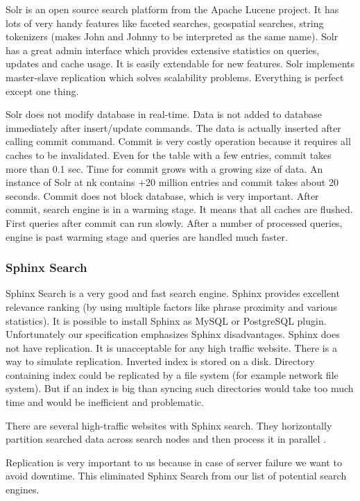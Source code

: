 \documentclass[10pt,a4paper]{article}
\begin{document}
Solr is an open source search platform from the Apache Lucene project. It has lots of very handy features like faceted searches, geospatial searches, string tokenizers (makes John and Johnny to be interpreted as the same name). Solr has a great admin interface which provides extensive statistics on queries, updates and cache usage. It is easily extendable for new features. Solr implements master-slave replication which solves scalability problems. Everything is perfect except one thing. 

Solr does not modify database in real-time. Data is not added to database immediately after insert/update commands. The data is actually inserted after calling commit command. Commit is very costly operation because it requires all caches to be invalidated. Even for the table with a few entries, commit takes more than 0.1 sec. Time for commit grows with a growing size of data. An instance of Solr at nk contains +20 million entries and commit takes about 20 seconds. Commit does not block database, which is very important. After commit, search engine is in a warming stage. It means that all caches are flushed. First queries after commit can run slowly. After a number of processed queries, engine is past warming stage and queries are handled much faster.

\subsubsection{Sphinx Search}

Sphinx Search is a very good and fast search engine. Sphinx provides excellent relevance ranking (by using multiple factors like phrase proximity and various statistics). It is possible to install Sphinx as MySQL or PostgreSQL plugin. Unfortunately our specification emphasizes Sphinx disadvantages.
Sphinx does not have replication. It is unacceptable for any high traffic website. There is a way to simulate replication. Inverted index is stored on a disk. Directory containing index could be replicated by a file system (for example network file system). But if an index is big than syncing such directories would take too much time and would be inefficient and problematic.

There are several high-traffic websites with Sphinx search. They horizontally partition searched data across search nodes and then process it in parallel \cite{SPHINXPARAL}.

Replication is very important to us because in case of server failure we want to avoid downtime. This eliminated Sphinx Search from our list of potential search engines. 
\end{document}
